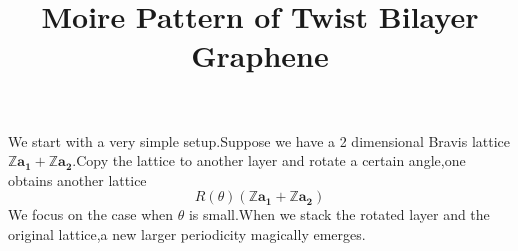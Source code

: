 \documentclass[a4paper,12pt]{article}
\title{Moire Pattern of Twist Bilayer Graphene}
\theoremstyle{mystyle}
\theoremstyle{mystyle}
\numberwithin{equation}{section}
\begin{document}
	\maketitle
	We start with a very simple setup.Suppose we have a 2 dimensional Bravis lattice $\mathbb{Z}\boldsymbol{a_1}+\mathbb{Z}\boldsymbol{a_2}$.Copy the lattice to another layer and rotate a certain angle,one obtains another lattice
	$$R(\theta)(\mathbb{Z}\boldsymbol{a_1}+\mathbb{Z}\boldsymbol{a_2})$$
	We focus on the case when $\theta$ is small.When we stack the rotated layer and the original lattice,a new larger periodicity magically emerges.
\end{document}
